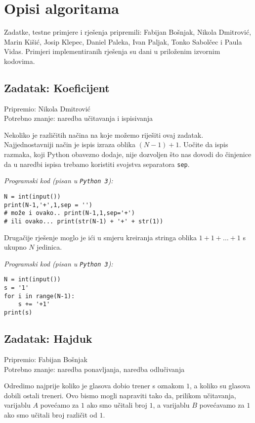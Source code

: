 \documentclass[a4paper]{article}
\begin{document}
\section*{Opisi algoritama}
Zadatke, testne primjere i rješenja pripremili: Fabijan Bošnjak, Nikola
Dmitrović, Marin Kišić, Josip Klepec, Daniel Paleka, Ivan Paljak, Tonko
Sabolčec i Paula Vidas. Primjeri implementiranih rješenja su dani u priloženim
izvornim kodovima.

\subsection*{Zadatak: Koeficijent}
\textsf{Pripremio: Nikola Dmitrović}\\
\textsf{Potrebno znanje: naredba učitavanja i ispisivanja}

Nekoliko je različitih načina na koje možemo riješiti ovaj zadatak.
Najjednostavniji način je ispis izraza oblika $(N-1)+1$. Uočite da ispis
razmaka, koji Python obavezno dodaje, nije dozvoljen što nas dovodi do
činjenice da u naredbi ispisa trebamo koristiti svojstva separatora
\texttt{sep}.

\textit{Programski kod (pisan u \texttt{Python 3}):}

\vspace{-2ex}
\begin{verbatim}
N = int(input())
print(N-1,'+',1,sep = '')
# može i ovako.. print(N-1,1,sep='+')
# ili ovako... print(str(N-1) + '+' + str(1))
\end{verbatim}

Drugačije rješenje moglo je ići u smjeru kreiranja stringa oblika $1+1+\dots+1$
s ukupno $N$ jedinica.

\textit{Programski kod (pisan u \texttt{Python 3}):}

\vspace{-2ex}
\begin{verbatim}
N = int(input())
s = '1'
for i in range(N-1):
    s += '+1'
print(s)
\end{verbatim}

\subsection*{Zadatak: Hajduk}
\textsf{Pripremio: Fabijan Bošnjak}\\
\textsf{Potrebno znanje: naredba ponavljanja, naredba odlučivanja}

Odredimo najprije koliko je glasova dobio trener s oznakom $1$, a koliko su
glasova dobili ostali treneri. Ovo bismo mogli napraviti tako da, prilikom
učitavanja, varijablu $A$ povećamo za $1$ ako smo učitali broj $1$, a
varijablu $B$ povećavamo za $1$ ako smo učitali broj različit od $1$.
\end{document}
